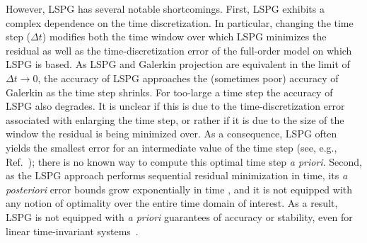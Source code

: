\documentclass[3p,computermodern,10pt]{elsarticle}
\begin{document}
However, LSPG has several notable shortcomings. First, LSPG
exhibits a complex dependence on the time discretization. In
particular, changing
the time step ($\Delta t$) modifies both the
time window over which LSPG minimizes the residual as well as the
time-discretization error of the full-order model on which LSPG is based. 
As LSPG and Galerkin projection are equivalent in the
limit of $\Delta t \rightarrow 0$, the accuracy of LSPG approaches the (sometimes poor)
accuracy of Galerkin as the time step shrinks.
For too-large a time step the accuracy of LSPG also degrades. It is unclear if this is due to the time-discretization error associated with enlarging the time step, or rather if it is due to the size of the window the residual is being minimized over.
As a
consequence, LSPG often yields the smallest error for an intermediate value of the
time step (see, e.g., Ref.~\cite[Figure 9]{carlberg_lspg_v_galerkin}); there
is no known way to compute this optimal time step \textit{a priori}.
Second, as the LSPG approach performs sequential residual minimization in
time, its \textit{a posteriori} error bounds grow exponentially in time
\cite{carlberg_lspg_v_galerkin}, and it is not equipped with any notion of
optimality over the entire time domain of interest. As a result, LSPG is not
equipped with \textit{a priori} guarantees of accuracy or stability, even for
linear time-invariant systems~\cite{bui_thesis}.
\end{document}
